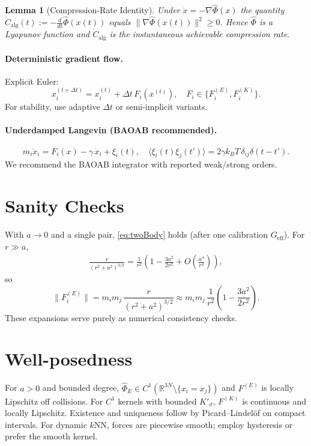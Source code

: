 \documentclass[11pt,a4paper]{article}
\numberwithin{equation}{section}
\newtheorem{lemma}{Lemma}[section]
\newcommand{\R}{\mathbb{R}}
\begin{document}
\begin{lemma}[Compression-Rate Identity]
\label{lem:compression-rate}
Under $\dot x=-\nabla\widehat{\Phi}(x)$ the quantity 
$\dot C_{\mathrm{alg}}(t):=-\frac{d}{dt}\widehat{\Phi}(x(t))$ equals 
$\|\nabla\widehat{\Phi}(x(t))\|^2\ge 0$. Hence $\widehat{\Phi}$ is a Lyapunov function and
$\dot C_{\mathrm{alg}}$ is the instantaneous achievable compression rate.
\end{lemma}

\paragraph{Deterministic gradient flow.}
Explicit Euler:
\begin{equation}
x_i^{(t+\Delta t)} = x_i^{(t)} + \Delta t\,F_i(x^{(t)}),\quad F_i\in\{F^{(E)}_i,F^{(K)}_i\}.
\end{equation}
For stability, use adaptive $\Delta t$ or semi-implicit variants.

\paragraph{Underdamped Langevin (BAOAB recommended).}
\begin{equation}
m_i\ddot{x}_i = F_i(x)-\gamma\,\dot{x}_i + \xi_i(t),\quad
\langle \xi_i(t)\xi_j(t')\rangle=2\gamma k_B T\,\delta_{ij}\delta(t-t').
\end{equation}
We recommend the BAOAB integrator with reported weak/strong orders.

\section{Sanity Checks}
With $a\to 0$ and a single pair, \eqref{eq:twoBody} holds (after one calibration $G_{\text{eff}}$).  
For $r\gg a$,
\begin{align}
\frac{r}{(r^2+a^2)^{3/2}}
= \frac{1}{r^2}\left(1-\frac{3a^2}{2r^2}+O\!\left(\frac{a^4}{r^4}\right)\right),
\end{align}
so
\begin{equation}
\big\lVert F^{(E)}_i\big\rVert
= m_im_j\,\frac{r}{(r^2+a^2)^{3/2}}
\approx m_im_j\,\frac{1}{r^2}\left(1-\frac{3a^2}{2r^2}\right).
\end{equation}
These expansions serve purely as numerical consistency checks.

\section{Well-posedness}
For $a>0$ and bounded degree, $\widehat{\Phi}_E\in C^1(\R^{3N}\setminus\{x_i=x_j\})$ and $F^{(E)}$ is locally Lipschitz off collisions. For $C^1$ kernels with bounded $K'_\sigma$, $F^{(K)}$ is continuous and locally Lipschitz. Existence and uniqueness follow by Picard–Lindelöf on compact intervals. For dynamic $k$NN, forces are piecewise smooth; employ hysteresis or prefer the smooth kernel.
\end{document}

